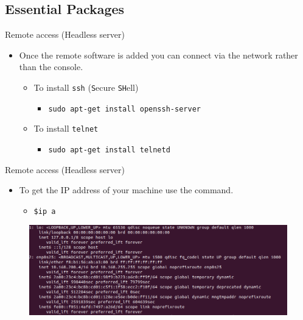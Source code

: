 \documentclass{beamer}
\begin{document}
\subsection{Essential Packages}
\begin{frame}{Remote access (Headless server)}
  \begin{itemize}
    \item Once the remote software is added you can connect via the network rather than the console.
      \begin{itemize}
        \item To install \texttt{ssh} (\texttt{S}ecure \texttt{SH}ell)
          \begin{itemize}
            \item \texttt{sudo apt-get install openssh-server}
          \end{itemize}
        \item To install \texttt{telnet}
          \begin{itemize}
            \item \texttt{sudo apt-get install telnetd}
          \end{itemize}
      \end{itemize}
  \end{itemize}
\end{frame}

\begin{frame}{Remote access (Headless server)}
  \begin{itemize}
    \item To get the IP address of your machine use the command.
      \begin{itemize}
        \item \texttt{\$ip a}
      \end{itemize}
  \end{itemize}
  \begin{figure}
    \begin{center}
      \includegraphics[width=1\linewidth]{ip.png}
    \end{center}
  \end{figure}
\end{frame}
\end{document}

